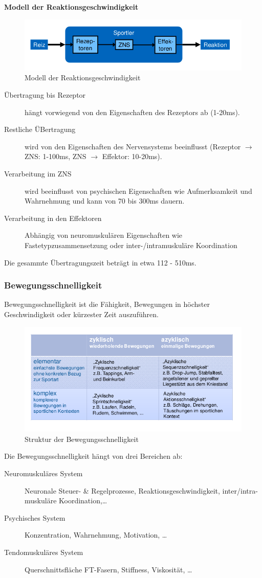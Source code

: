 \textbf{Modell der Reaktionsgeschwindigkeit}\\
\begin{figure}[H]
  \centering
  \includegraphics[width=.5\textwidth]{pictures/reaktionsgeschwindigkeit_modell.png}
  \caption{Modell der Reaktionsgeschwindigkeit}
\end{figure}
\begin{description}
    \item[Übertragung bis Rezeptor] hängt vorwiegend von den Eigenschaften des Rezeptors ab (1-20ms).
    \item[Restliche ÜBertragung] wird von den Eigenschaften des Nervensystems beeinflusst (Rezeptor $\rightarrow$ ZNS: 1-100ms, ZNS $\rightarrow$ Effektor: 10-20ms).
    \item[Verarbeitung im ZNS] wird beeinflusst von psychischen Eigenschaften wie Aufmerksamkeit und Wahrnehmung und kann von 70 bis 300ms dauern.
    \item[Verarbeitung in den Effektoren] Abhängig von neuromuskulären Eigenschaften wie Fastetypzusammensetzung oder inter-/intramuskuläre Koordination
\end{description}
Die gesammte Übertragungszeit beträgt in etwa 112 - 510ms.

\subsubsection{Bewegungsschnelligkeit}
Bewegungsschnelligkeit ist die Fähigkeit, Bewegungen in höchster Geschwindigkeit oder kürzester Zeit auszuführen.
\begin{figure}[H]
    \centering
    \includegraphics[width=.7\textwidth]{pictures/bewegungsgeschwindigkeit_struktur.png}
    \caption{Struktur der Bewegungsschnelligkeit}
\end{figure}

Die Bewegungsschnelligkeit hängt von drei Bereichen ab:
\begin{description}
    \item[Neuromuskuläres System] Neuronale Steuer- \& Regelprozesse, Reaktionsgeschwindigkeit, inter/intra-muskuläre Koordination,\ldots
    \item[Psychisches System] Konzentration, Wahrnehmung, Motivation, \ldots
    \item[Tendomuskuläres System] Querschnittsfläche FT-Fasern, Stiffness, Viskosität, \ldots
\end{description}

